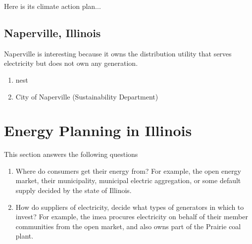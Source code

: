 Here is its climate action plan...

\subsection{Naperville, Illinois}
Naperville is interesting because it owns the distribution utility that serves
electricity but does not own any generation.
\begin{enumerate}
    \item \ac{nest}
    \item City of Naperville (Sustainability Department)
\end{enumerate}

\section{Energy Planning in Illinois}

This section answers the following questions
\begin{enumerate}
    \item Where do consumers get their energy from? For example, the open energy
    market, their municipality, municipal electric aggregation, or some default
    supply decided by the state of Illinois.
    \item How do suppliers of electricity, decide what types of generators in
    which to invest? For example, the \ac{imea} procures electricity on behalf
    of their member communities from the open market, and also owns part of the
    Prairie coal plant.
\end{enumerate}





